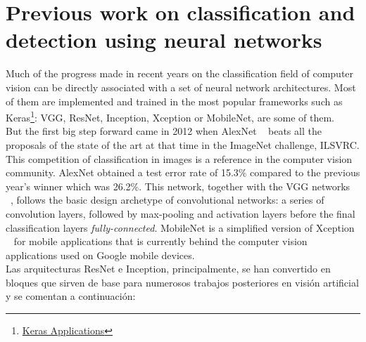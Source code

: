 \documentclass{bmvc2k}
\begin{document}
\section{Previous work on classification and detection using neural networks}
Much of the progress made in recent years on the classification field of computer vision can be directly associated with a set of neural network architectures. Most of them are implemented and trained in the most popular frameworks such as Keras\footnote {\href{https://keras.io/applications/}{Keras Applications}}: VGG, ResNet, Inception, Xception or MobileNet, are some of them.\\ But the first big step forward came in 2012 when AlexNet ~\cite{krizhevsky2012imagenet} beats all the proposals of the state of the art at that time in the ImageNet challenge, ILSVRC. This competition of classification in images is a reference in the computer vision community. AlexNet obtained a test error rate of 15.3\% compared to the previous year's winner which was 26.2\%. This network, together with the VGG networks ~\cite{simonyan2014very}, follows the basic design archetype of convolutional networks: a series of convolution layers, followed by max-pooling and activation layers before the final classification layers \textit{fully-connected}. MobileNet is a simplified version of Xception ~\cite{chollet2016xception} for mobile applications that is currently behind the computer vision applications used on Google mobile devices.\\
Las arquitecturas ResNet e Inception, principalmente, se han convertido en bloques que sirven de base para numerosos trabajos posteriores en visión artificial y se comentan a continuación: %
\end{document}
